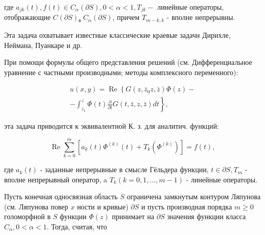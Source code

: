 \documentclass[10pt]{article}
\begin{document}
где $a_{j k}(t), f(t) \in C_{\alpha}(\partial S), 0<\alpha<1, T_{j k}-$ линейные операторы, отображающие $C(\partial S){ }_{\text {в }} C_{\alpha}(\partial S)$, причем $T_{m-k, k}$ - вполне непрерывны.



Эта задача охватывает известные классические краевые задачи Дирихле, Неймана, Пуанкаре и др.



При помощи формулы общего представления решений (см. Дифференциальное уравнение с частными производными; методы комплексного переменного):



\[

\begin{gathered}

u(x, y)=\operatorname{Re}\left\{G\left(z, \bar{z}_{0} z, \bar{z}\right) \Phi(z)-\right. \\

\left.-\int_{z_{1}}^{z} \Phi(t) \frac{\partial}{\partial t} G(t, \bar{z}, z, \bar{z}) d t\right\},

\end{gathered}

\]



эта задача приводится к эквивалентной $К$. з. для аналитич. функций:



\[

\operatorname{Re} \sum_{k=0}^{m}\left[a_{k}(t) \Phi^{(k)}(t)+T_{k}\left(\Phi^{(k)}\right)\right]=f(t),

\]



где $a_{k}(t)$ - заданные непрерывные в смысле Гёльдера функции, $t \in \partial S, T_{m}$ - вполне непрерывный оператор, a $T_{k}(k=0,1, \ldots, m-1)$ - линейные операторы.



Пусть конечная односвязная область $S$ ограничена замкнутым контуром Ляпунова (см. Ляпунова повер $x$ ности и кривые) $\partial S$ и пусть производная порядка $m \geqslant 0$ голоморфной в $S$ функции $\Phi(z)$ принимает на $\partial S$ значения функции класса $C_{\alpha}, 0<\alpha<1$. Тогда, считая, что
\end{document}
